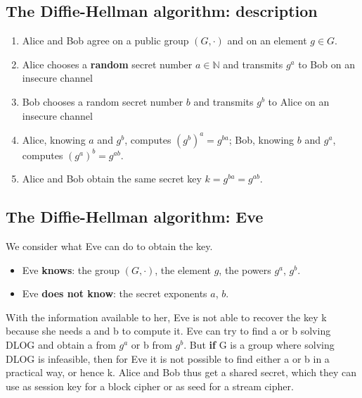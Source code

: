 \documentclass[a4paper, 10pt, titlepage]{article}
\begin{document}
\subsection{The Diffie-Hellman algorithm: description}
\begin{enumerate}
\item Alice and Bob agree on a public group $(G, \cdot)$ and on an
element $g \in G$.
\item Alice chooses a \textbf{random} secret number $a \in \mathbb{N}$ and transmits $g^a$ to Bob on an insecure channel
\item Bob chooses a random secret number $b$ and transmits $g^b$ to Alice on an insecure channel
\item Alice, knowing $a$ and $g^b$, computes $(g^b)^a = g^{ba}$;
Bob, knowing $b$ and $g^a$, computes $(g^a)^b = g^{ab}$.
\item Alice and Bob obtain the same secret key $k = g^{ba} = g^{ab}$.
\end{enumerate}

\subsection{The Diffie-Hellman algorithm: Eve}
We consider what Eve can do to obtain the key.
\begin{itemize}
\item Eve \textbf{knows}: the group $(G , \cdot)$, the element $g$, the powers $g^a$, $g^b$.
\item Eve \textbf{does not know}: the secret exponents $a$, $b$.
\end{itemize}
With the information available to her, Eve is not able to recover the key k because she needs a and b to compute it.
Eve can try to find a or b solving DLOG and obtain a from $g^a$ or b from $g^b$. But \textbf{if} G is a group where solving DLOG is infeasible, then for Eve it is not possible to find either a or b in a practical way, or hence k. Alice and Bob thus get a shared secret, which they can use as session key for a block cipher or as seed for a stream cipher.
\end{document}
